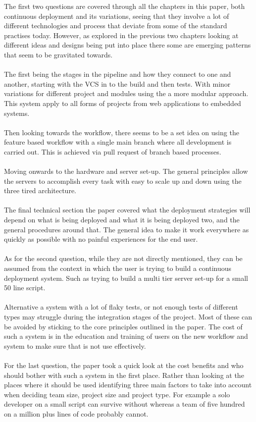 The first two questions are covered through all the chapters in this paper, both continuous deployment and its variations, seeing that they involve a lot of different technologies and process that deviate from some of the standard practises today. However, as explored in the previous two chapters looking at different ideas and designs being put into place there some are emerging patterns that seem to be gravitated towards.
\\\\
The first being the stages in the pipeline and how they connect to one and another, starting with the VCS in to the build and then tests. With minor variations for different project and modules using the a more modular approach. This system apply to all forms of projects from web applications to embedded systems.
\\\\
Then looking towards the workflow, there seems to be a set idea on using the feature based workflow with a single main branch where all development is carried out. This is achieved via pull request of branch based processes.
\\\\
Moving onwards to the hardware and server set-up. The general principles allow the servers to accomplish every task with easy to scale up and down using the three tired architecture.
\\\\
The final technical section the paper covered what the deployment strategies will depend on what is being deployed and what it is being deployed two, and the general procedures around that. The general idea to make it work everywhere as quickly as possible with no painful experiences for the end user.
\\\\
As for the second question, while they are not directly mentioned, they can be assumed from the context in which the user is trying to build a continuous deployment system. Such as trying to build a multi tier server set-up for a small 50 line script. 
\\\\
Alternative a system with a lot of flaky tests, or not enough tests of different types may struggle during the integration stages of the project. Most of these can be avoided by sticking to the core principles outlined in the paper. The cost of such a system is in the education and training of users on the new workflow and system to make sure that is not use effectively.
\\\\
For the last question, the paper took a quick look at the cost benefits and who should bother with such a system in the first place. Rather than looking at the places where it should be used identifying three main factors to take into account when deciding team size, project size and project type. For example a solo developer on a small script can survive without whereas a team of five hundred on  a million plus lines of code probably cannot.


